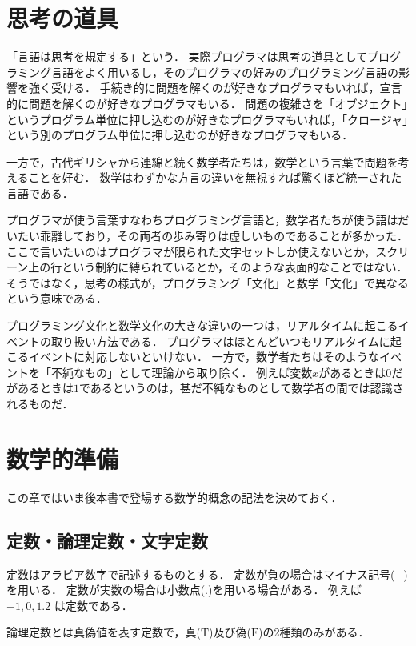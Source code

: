 \documentclass[twocolumn]{jsbook}
\newcommand{\falsevalue}{\text{F}}
\newcommand{\truevalue}{\text{T}}
\begin{document}
\chapter{思考の道具}

「言語は思考を規定する」という．
実際プログラマは思考の道具としてプログラミング言語をよく用いるし，そのプログラマの好みのプログラミング言語の影響を強く受ける．
手続き的に問題を解くのが好きなプログラマもいれば，宣言的に問題を解くのが好きなプログラマもいる．
問題の複雑さを「オブジェクト」というプログラム単位に押し込むのが好きなプログラマもいれば，「クロージャ」という別のプログラム単位に押し込むのが好きなプログラマもいる．

一方で，古代ギリシャから連綿と続く数学者たちは，数学という言葉で問題を考えることを好む．
数学はわずかな方言の違いを無視すれば驚くほど統一された言語である．

プログラマが使う言葉すなわちプログラミング言語と，数学者たちが使う語はだいたい乖離しており，その両者の歩み寄りは虚しいものであることが多かった．
ここで言いたいのはプログラマが限られた文字セットしか使えないとか，スクリーン上の行という制約に縛られているとか，そのような表面的なことではない．
そうではなく，思考の様式が，プログラミング「文化」と数学「文化」で異なるという意味である．

プログラミング文化と数学文化の大きな違いの一つは，リアルタイムに起こるイベントの取り扱い方法である．
プログラマはほとんどいつもリアルタイムに起こるイベントに対応しないといけない．
一方で，数学者たちはそのようなイベントを「不純なもの」として理論から取り除く．
例えば変数$x$があるときは$0$だがあるときは$1$であるというのは，甚だ不純なものとして数学者の間では認識されるものだ．

\chapter{数学的準備}

この章ではいま後本書で登場する数学的概念の記法を決めておく．

\section{定数・論理定数・文字定数}

定数はアラビア数字で記述するものとする．
定数が負の場合はマイナス記号($-$)を用いる．
定数が実数の場合は小数点($.$)を用いる場合がある．
例えば $-1, 0, 1.2$ は定数である．

論理定数とは真偽値を表す定数で，真($\truevalue$)及び偽($\falsevalue$)の2種類のみがある．
\end{document}
